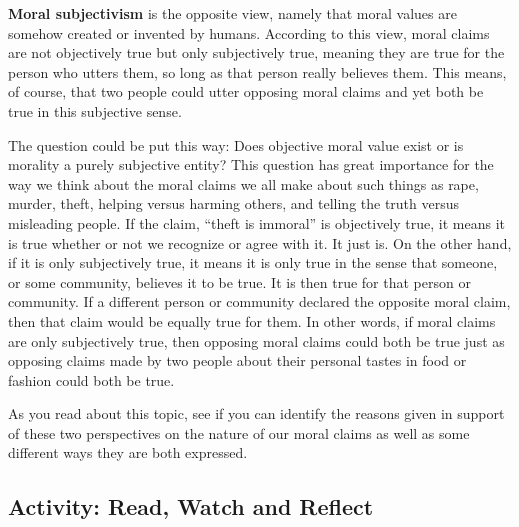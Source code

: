 \documentclass[
]{book}
\begin{document}
\textbf{Moral subjectivism} is the opposite view, namely that moral values are somehow created or invented by humans. According to this view, moral claims are not objectively true but only subjectively true, meaning they are true for the person who utters them, so long as that person really believes them. This means, of course, that two people could utter opposing moral claims and yet both be true in this subjective sense.

The question could be put this way: Does objective moral value exist or is morality a purely subjective entity? This question has great importance for the way we think about the moral claims we all make about such things as rape, murder, theft, helping versus harming others, and telling the truth versus misleading people. If the claim, ``theft is immoral'' is objectively true, it means it is true whether or not we recognize or agree with it. It just is. On the other hand, if it is only subjectively true, it means it is only true in the sense that someone, or some community, believes it to be true. It is then true for that person or community. If a different person or community declared the opposite moral claim, then that claim would be equally true for them. In other words, if moral claims are only subjectively true, then opposing moral claims could both be true just as opposing claims made by two people about their personal tastes in food or fashion could both be true.

As you read about this topic, see if you can identify the reasons given in support of these two perspectives on the nature of our moral claims as well as some different ways they are both expressed.

\hypertarget{activity-read-watch-and-reflect-2}{%
\subsection*{Activity: Read, Watch and Reflect}\label{activity-read-watch-and-reflect-2}}
\end{document}
